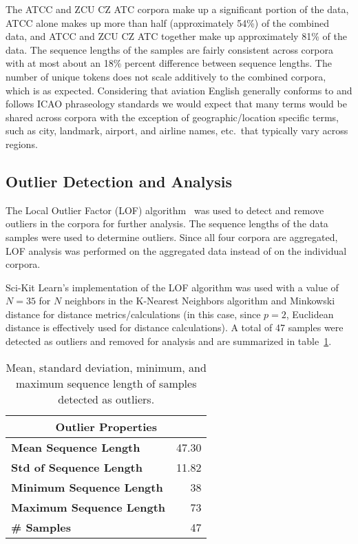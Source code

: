 \documentclass[12pt]{article}
\begin{document}
The ATCC and ZCU CZ ATC corpora make up a significant portion of the data, ATCC alone makes up more than half (approximately 54\%) of the combined
data, and ATCC and ZCU CZ ATC together make up approximately 81\% of the data. The sequence lengths of the samples are fairly consistent across
corpora with at most about an 18\% percent difference between sequence lengths. The number of unique tokens does not scale additively to the
combined corpora, which is as expected. Considering that aviation English generally conforms to and follows ICAO phraseology standards we would expect
that many terms would be shared across corpora with the exception of geographic/location specific terms, such as city, landmark, airport, and airline
names, etc.~that typically vary across regions.

\subsection{Outlier Detection and Analysis}\label{sec:outliers}
The Local Outlier Factor (LOF) algorithm~\cite{breunig_lof_2000} was used to detect and remove outliers in the corpora for further analysis. The
sequence lengths of the data samples were used to determine outliers. Since all four corpora are aggregated, LOF analysis was performed on the
aggregated data instead of on the individual corpora.

Sci-Kit Learn's implementation of the LOF
algorithm was used with a value of \(N = 35\) for \(N\) neighbors in the K-Nearest Neighbors algorithm and Minkowski distance for distance
metrics/calculations (in this case, since \(p=2\), Euclidean distance is effectively used for distance calculations). A total of 47 samples were
detected as outliers and removed for analysis and are summarized in table~\ref{table:outlier_stats}.

\begin{table}[h!]
    \centering
    \begin{tabular}{l | r}
        \toprule
        \multicolumn{2}{c}{Outlier Properties}   \\
        \midrule
        \textbf{Mean Sequence Length}    & 47.30 \\
        \textbf{Std of Sequence Length}  & 11.82 \\
        \textbf{Minimum Sequence Length} & 38    \\
        \textbf{Maximum Sequence Length} & 73    \\
        \textbf{\# Samples}              & 47    \\
        \bottomrule
    \end{tabular}
    \label{table:outlier_stats}
    \caption{Mean, standard deviation, minimum, and maximum sequence length of samples detected as outliers.}
\end{table}
\end{document}
